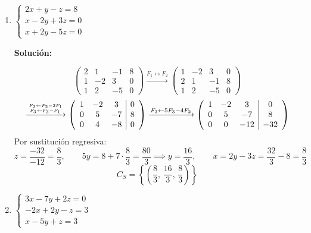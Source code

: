 \documentclass[12pt]{article}
\newcommand{\solucion}{%
    \vspace{0.8em}%
    \textbf{Solución:}%
}
\begin{document}
\begin{enumerate}[label=\alph*.-]
    \item $\begin{cases} 2x + y - z = 8 \\ x - 2y + 3z = 0 \\ x + 2y - 5z = 0 \end{cases}$

    \solucion
    \[
    \left(\begin{array}{ccc|c}
    2 & 1 & -1 & 8 \\ 1 & -2 & 3 & 0 \\ 1 & 2 & -5 & 0
    \end{array}\right)
    \xrightarrow{F_1 \leftrightarrow F_2}
    \left(\begin{array}{ccc|c}
    1 & -2 & 3 & 0 \\ 2 & 1 & -1 & 8 \\ 1 & 2 & -5 & 0
    \end{array}\right)
    \]
    \[
    \xrightarrow{F_2 \leftarrow F_2 - 2F_1 \atop F_3 \leftarrow F_3 - F_1}
    \left(\begin{array}{ccc|c}
    1 & -2 & 3 & 0 \\ 0 & 5 & -7 & 8 \\ 0 & 4 & -8 & 0
    \end{array}\right)
    \xrightarrow{F_3 \leftarrow 5F_3 - 4F_2}
    \left(\begin{array}{ccc|c}
    1 & -2 & 3 & 0 \\ 0 & 5 & -7 & 8 \\ 0 & 0 & -12 & -32
    \end{array}\right)
    \]
    Por sustitución regresiva:
    \[
    z = \frac{-32}{-12} = \frac{8}{3}, \qquad
    5y = 8 + 7\cdot\frac{8}{3} = \frac{80}{3} \implies y = \frac{16}{3}, \qquad
    x = 2y - 3z = \frac{32}{3} - 8 = \frac{8}{3}
    \]
    \[
    \boxed{C_S = \left\{\left(\frac{8}{3},\,\frac{16}{3},\,\frac{8}{3}\right)\right\}}
    \]

    \item $\begin{cases} 3x - 7y + 2z = 0 \\ -2x + 2y - z = 3 \\ x - 5y + z = 3 \end{cases}$


\end{enumerate}
\end{document}
